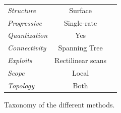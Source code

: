 \documentclass{report}
\begin{document}
\begin{figure}
{\begin{tabular}{||l|c|c||}
  \hline

  \emph{Structure} & Surface & \\

  \emph{Progressive} & Single-rate & \\  

  \emph{Quantization} & Yes & \\

  \emph{Connectivity} & Spanning Tree & \\

  \emph{Exploits} & Rectilinear scans & \\

  \emph{Scope} & Local & \\

  \emph{Topology} & Both & \\

  \hline
\end{tabular}
}
\caption{Taxonomy of the different methods.}\label{fig:taxonomy}
\end{figure}


\nocite{*}


\end{document}
